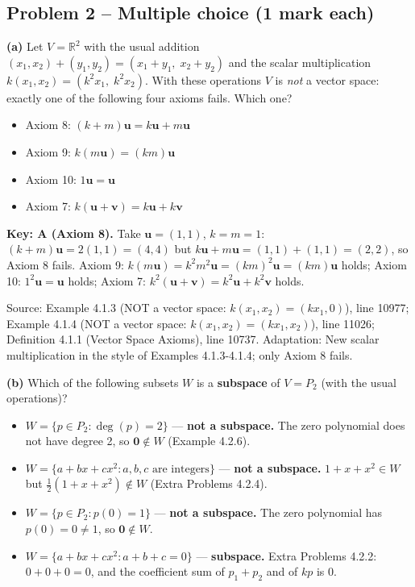 \documentclass[11pt,a4paper]{article}
\newcommand{\Src}[1]{{\footnotesize\color{black!65}Source: #1}}
\begin{document}
\subsection*{Problem 2 -- Multiple choice (1 mark each)}
\textbf{(a)} Let $V=\mathbb{R}^2$ with the usual addition $(x_1,x_2)+(y_1,y_2)=(x_1+y_1,\;x_2+y_2)$ and the scalar multiplication $k(x_1,x_2)=(k^2x_1,\;k^2x_2)$. With these operations $V$ is \emph{not} a vector space: exactly one of the following four axioms fails. Which one?\par
\begin{itemize}[leftmargin=8mm,itemsep=0pt]\item[A$^{\ast}$] Axiom 8: $(k+m)\mathbf{u}=k\mathbf{u}+m\mathbf{u}$\item[B] Axiom 9: $k(m\mathbf{u})=(km)\mathbf{u}$\item[C] Axiom 10: $1\mathbf{u}=\mathbf{u}$\item[D] Axiom 7: $k(\mathbf{u}+\mathbf{v})=k\mathbf{u}+k\mathbf{v}$\end{itemize}
\textbf{Key: A (Axiom 8).} Take $\mathbf{u}=(1,1)$, $k=m=1$: $(k+m)\mathbf{u}=2(1,1)=(4,4)$ but $k\mathbf{u}+m\mathbf{u}=(1,1)+(1,1)=(2,2)$, so Axiom 8 fails. Axiom 9: $k(m\mathbf{u})=k^2m^2\mathbf{u}=(km)^2\mathbf{u}=(km)\mathbf{u}$ holds; Axiom 10: $1^2\mathbf{u}=\mathbf{u}$ holds; Axiom 7: $k^2(\mathbf{u}+\mathbf{v})=k^2\mathbf{u}+k^2\mathbf{v}$ holds.\par
\Src{Example 4.1.3 (NOT a vector space: $k(x_1,x_2)=(kx_1,0)$), line 10977; Example 4.1.4 (NOT a vector space: $k(x_1,x_2)=(kx_1,x_2)$), line 11026; Definition 4.1.1 (Vector Space Axioms), line 10737. Adaptation: New scalar multiplication in the style of Examples 4.1.3-4.1.4; only Axiom 8 fails.}\par
\textbf{(b)} Which of the following subsets $W$ is a \textbf{subspace} of $V=P_2$ (with the usual operations)?\par
\begin{itemize}[leftmargin=8mm,itemsep=0pt]\item[A] $W=\{p\in P_2 : \deg(p)=2\}$ --- \textbf{not a subspace.} The zero polynomial does not have degree 2, so $\mathbf{0}\notin W$ (Example 4.2.6).\item[B] $W=\{a+bx+cx^2 : a,b,c \text{ are integers}\}$ --- \textbf{not a subspace.} $1+x+x^2\in W$ but $\tfrac12(1+x+x^2)\notin W$ (Extra Problems 4.2.4).\item[C] $W=\{p\in P_2 : p(0)=1\}$ --- \textbf{not a subspace.} The zero polynomial has $p(0)=0\neq1$, so $\mathbf{0}\notin W$.\item[D$^{\ast}$] $W=\{a+bx+cx^2 : a+b+c=0\}$ --- \textbf{subspace.} Extra Problems 4.2.2: $0+0+0=0$, and the coefficient sum of $p_1+p_2$ and of $kp$ is $0$.\end{itemize}
\end{document}
